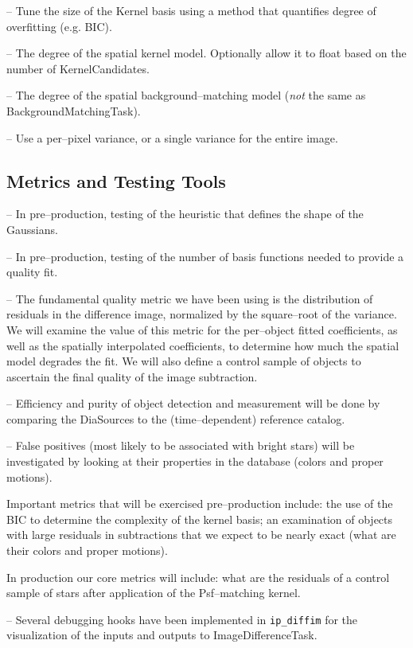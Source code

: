 \documentclass[12pt]{article}
\begin{document}
-- Tune the size of the Kernel basis using a method that quantifies
degree of overfitting (e.g. BIC).

-- The degree of the spatial kernel model.  Optionally allow it to
float based on the number of KernelCandidates.

-- The degree of the spatial background--matching model ({\it not} the
same as BackgroundMatchingTask).

-- Use a per--pixel variance, or a single variance for the entire
image.

\subsection{Metrics and Testing Tools}

-- In pre--production, testing of the heuristic that defines the shape
of the Gaussians.

-- In pre--production, testing of the number of basis functions needed
to provide a quality fit.  

-- The fundamental quality metric we have been using is the
distribution of residuals in the difference image, normalized by the
square--root of the variance.  We will examine the value of this
metric for the per--object fitted coefficients, as well as the
spatially interpolated coefficients, to determine how much the spatial
model degrades the fit.  We will also define a control sample of
objects to ascertain the final quality of the image subtraction.

-- Efficiency and purity of object detection and measurement will be
done by comparing the DiaSources to the (time--dependent) reference
catalog.

-- False positives (most likely to be associated with bright stars)
will be investigated by looking at their properties in the database
(colors and proper motions).

Important metrics that will be exercised pre--production include: the
use of the BIC to determine the complexity of the kernel basis; an
examination of objects with large residuals in subtractions that we
expect to be nearly exact (what are their colors and proper motions).

In production our core metrics will include: what are the residuals of
a control sample of stars after application of the Psf--matching
kernel.

-- Several debugging hooks have been implemented in {\tt ip\_diffim} for
the visualization of the inputs and outputs to ImageDifferenceTask.
\end{document}

